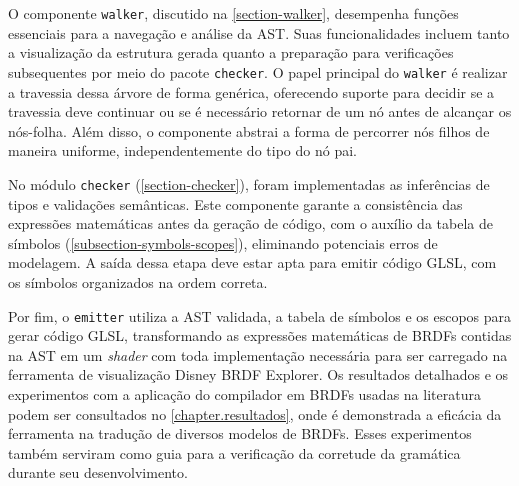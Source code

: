 O componente \texttt{walker}, discutido na \autoref{section-walker}, desempenha funções essenciais para a navegação e análise da AST. Suas funcionalidades incluem tanto a visualização da estrutura gerada quanto a preparação para verificações subsequentes por meio do pacote \texttt{checker}. O papel principal do \texttt{walker} é realizar a travessia dessa árvore de forma genérica, oferecendo suporte para decidir se a travessia deve continuar ou se é necessário retornar de um nó antes de alcançar os nós-folha. Além disso, o componente abstrai a forma de percorrer nós filhos de maneira uniforme, independentemente do tipo do nó pai.

No módulo \texttt{checker} (\autoref{section-checker}), foram implementadas as inferências de tipos e validações semânticas. Este componente garante a consistência das expressões matemáticas antes da geração de código, com o auxílio da tabela de símbolos (\autoref{subsection-symbols-scopes}), eliminando potenciais erros de modelagem. A saída dessa etapa deve estar apta para emitir código GLSL, com os símbolos organizados na ordem correta.

Por fim, o \texttt{emitter} utiliza a AST validada, a tabela de símbolos e os escopos para gerar código GLSL, transformando as expressões matemáticas de BRDFs contidas na AST em um \textit{shader} com toda implementação necessária para ser carregado na ferramenta de visualização Disney BRDF Explorer. Os resultados detalhados e os experimentos com a aplicação do compilador em BRDFs usadas na literatura podem ser consultados no \autoref{chapter.resultados}, onde é demonstrada a eficácia da ferramenta na tradução de diversos modelos de BRDFs. Esses experimentos também serviram como guia para a verificação da corretude da gramática durante seu desenvolvimento.








